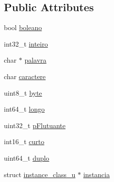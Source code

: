 \subsection*{Public Attributes}
\begin{DoxyCompactItemize}
\item 
bool \hyperlink{uniontype__s_a241f8a42a562eb89ec706b49fdc57fa4}{boleano}
\item 
int32\+\_\+t \hyperlink{uniontype__s_aae62bd50056419f589251ba19ccec495}{inteiro}
\item 
char $\ast$ \hyperlink{uniontype__s_a928b195b66117b6e096e827bae77e383}{palavra}
\item 
char \hyperlink{uniontype__s_aeb26be2a0a0b2e29de7a74e72bb8e492}{caractere}
\item 
uint8\+\_\+t \hyperlink{uniontype__s_ae617ad116eb257d0e29ba494417a5211}{byte}
\item 
int64\+\_\+t \hyperlink{uniontype__s_ac1a3506b187aafcb7e0d2d40fe3504eb}{longo}
\item 
uint32\+\_\+t \hyperlink{uniontype__s_a623284016957f5697ce4e7d8c68330d9}{p\+Flutuante}
\item 
int16\+\_\+t \hyperlink{uniontype__s_a196bd0937bc2417894575a9102fae072}{curto}
\item 
uint64\+\_\+t \hyperlink{uniontype__s_aaed010195aac62a0d280a663c9bb8ab4}{duplo}
\item 
struct \hyperlink{structinstance__class__u}{instance\+\_\+class\+\_\+u} $\ast$ \hyperlink{uniontype__s_ad3996647e9adaa3f5e6b827f5112ae48}{instancia}
\end{DoxyCompactItemize}


